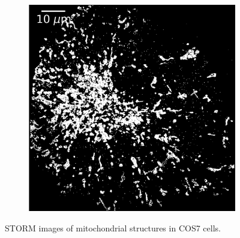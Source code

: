 \begin{figure}[htbp]
\begin{subfigure}{0.49\textwidth}
        \includegraphics[width=\textwidth]{figures/mitochondria_image12.png}
        \caption{}
    \end{subfigure}
    \caption{STORM images of mitochondrial structures in COS7 cells.}
    \label{fig:extra_mitochondria_images}
\end{figure}

